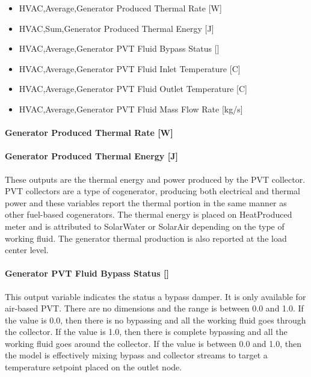 \begin{itemize}
\item
  HVAC,Average,Generator Produced Thermal Rate {[}W{]}
\item
  HVAC,Sum,Generator Produced Thermal Energy {[}J{]}
\item
  HVAC,Average,Generator PVT Fluid Bypass Status {[]}
\item
  HVAC,Average,Generator PVT Fluid Inlet Temperature {[}C{]}
\item
  HVAC,Average,Generator PVT Fluid Outlet Temperature {[}C{]}
\item
  HVAC,Average,Generator PVT Fluid Mass Flow Rate {[}kg/s{]}
\end{itemize}

\paragraph{Generator Produced Thermal Rate {[}W{]}}\label{generator-produced-thermal-rate-w-000}

\paragraph{Generator Produced Thermal Energy {[}J{]}}\label{generator-produced-thermal-energy-j-000}

These outputs are the thermal energy and power produced by the PVT collector. PVT collectors are a type of cogenerator, producing both electrical and thermal power and these variables report the thermal portion in the same manner as other fuel-based cogenerators. The thermal energy is placed on HeatProduced meter and is attributed to SolarWater or SolarAir depending on the type of working fluid. The generator thermal production is also reported at the load center level.

\paragraph{Generator PVT Fluid Bypass Status {[]}}\label{generator-pvt-fluid-bypass-status}

This output variable indicates the status a bypass damper. It is only available for air-based PVT. There are no dimensions and the range is between 0.0 and 1.0. If the value is 0.0, then there is no bypassing and all the working fluid goes through the collector. If the value is 1.0, then there is complete bypassing and all the working fluid goes around the collector. If the value is between 0.0 and 1.0, then the model is effectively mixing bypass and collector streams to target a temperature setpoint placed on the outlet node.

